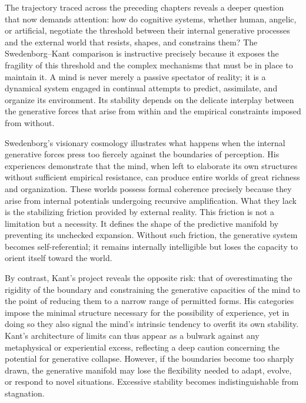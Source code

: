 \documentclass[12pt]{article}
\begin{document}
The trajectory traced across the preceding chapters reveals a deeper question 
that now demands attention: how do cognitive systems, whether human, angelic, 
or artificial, negotiate the threshold between their internal generative 
processes and the external world that resists, shapes, and constrains them?  
The Swedenborg–Kant comparison is instructive precisely because it exposes the 
fragility of this threshold and the complex mechanisms that must be in place 
to maintain it. A mind is never merely a passive spectator of reality; it is a 
dynamical system engaged in continual attempts to predict, assimilate, and 
organize its environment. Its stability depends on the delicate interplay 
between the generative forces that arise from within and the empirical 
constraints imposed from without.

Swedenborg’s visionary cosmology illustrates what happens when the internal 
generative forces press too fiercely against the boundaries of perception. His 
experiences demonstrate that the mind, when left to elaborate its own 
structures without sufficient empirical resistance, can produce entire worlds 
of great richness and organization. These worlds possess formal coherence 
precisely because they arise from internal potentials undergoing recursive 
amplification. What they lack is the stabilizing friction provided by 
external reality. This friction is not a limitation but a necessity. It defines 
the shape of the predictive manifold by preventing its unchecked expansion.  
Without such friction, the generative system becomes self-referential; it 
remains internally intelligible but loses the capacity to orient itself toward 
the world.

By contrast, Kant’s project reveals the opposite risk: that of overestimating 
the rigidity of the boundary and constraining the generative capacities of the 
mind to the point of reducing them to a narrow range of permitted forms. His 
categories impose the minimal structure necessary for the possibility of 
experience, yet in doing so they also signal the mind’s intrinsic tendency to 
overfit its own stability. Kant’s architecture of limits can thus appear as 
a bulwark against any metaphysical or experiential excess, reflecting a deep 
caution concerning the potential for generative collapse. However, if the 
boundaries become too sharply drawn, the generative manifold may lose the 
flexibility needed to adapt, evolve, or respond to novel situations. Excessive 
stability becomes indistinguishable from stagnation.
\end{document}
